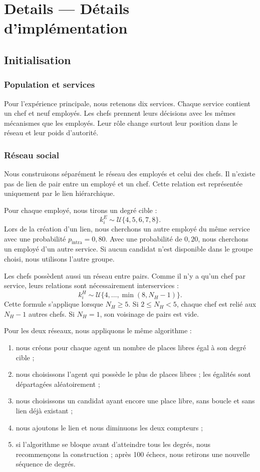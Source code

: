 \documentclass[11pt,a4paper]{article}
\begin{document}
\section{Details — Détails d’implémentation}

\subsection{Initialisation}

\subsubsection{Population et services}

Pour l’expérience principale, nous retenons dix services. Chaque service
contient un chef et neuf employés. Les chefs prennent leurs décisions avec les
mêmes mécanismes que les employés. Leur rôle change surtout leur position dans
le réseau et leur poids d’autorité.

\subsubsection{Réseau social}

Nous construisons séparément le réseau des employés et celui des chefs. Il
n’existe pas de lien de pair entre un employé et un chef. Cette relation est
représentée uniquement par le lien hiérarchique.

Pour chaque employé, nous tirons un degré cible :
\[
k_i^{E}\sim\mathcal{U}\{4,5,6,7,8\}.
\]
Lors de la création d’un lien, nous cherchons un autre employé du même service
avec une probabilité $p_{\mathrm{intra}}=0{,}80$. Avec une probabilité de
$0{,}20$, nous cherchons un employé d’un autre service. Si aucun candidat n’est
disponible dans le groupe choisi, nous utilisons l’autre groupe.

Les chefs possèdent aussi un réseau entre pairs. Comme il n’y a qu’un chef par
service, leurs relations sont nécessairement interservices :
\[
k_i^{H}\sim\mathcal{U}\{4,\ldots,\min(8,N_H-1)\}.
\]
Cette formule s’applique lorsque $N_H\geq5$. Si $2\leq N_H<5$, chaque chef est
relié aux $N_H-1$ autres chefs. Si $N_H=1$, son voisinage de pairs est vide.

Pour les deux réseaux, nous appliquons le même algorithme :

\begin{enumerate}
  \item nous créons pour chaque agent un nombre de places libres égal à son
  degré cible ;
  \item nous choisissons l’agent qui possède le plus de places libres ; les
  égalités sont départagées aléatoirement ;
  \item nous choisissons un candidat ayant encore une place libre, sans boucle
  et sans lien déjà existant ;
  \item nous ajoutons le lien et nous diminuons les deux compteurs ;
  \item si l’algorithme se bloque avant d’atteindre tous les degrés, nous
  recommençons la construction ; après 100 échecs, nous retirons une nouvelle
  séquence de degrés.
\end{enumerate}
\end{document}
